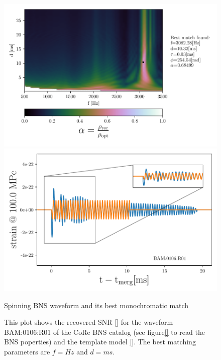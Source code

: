 \begin{figure}[!htbp]
\begin{center}
\begin{minipage}[t]{0.5\linewidth}
\vspace{0pt}
\includegraphics[scale=0.6,trim={2mm 0 35mm 0},clip]{images/Data_analysis/results/2D_grid_5.pdf}
\end{minipage}%
\begin{minipage}[t]{0.5\linewidth}
\vspace{20pt}
\includegraphics[scale=0.45]{images/Data_analysis/results/2D_grid_6.pdf}
\end{minipage}
\captionsetup{width=0.8\textwidth}
\caption{Spinning BNS waveform and its best monochromatic match}
\caption*{This plot shows the recovered SNR \ref{} for the waveform BAM:0106:R01 of the CoRe BNS catalog \cite{}(see figure\ref{} to read the BNS poperties) and the template model \ref{}. The best matching parameters are $f=Hz$ and $d=ms$.}
\end{center}
\end{figure}

